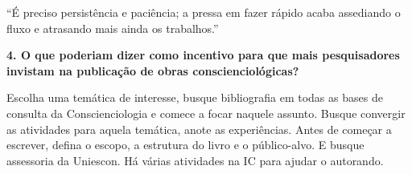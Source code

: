 \documentclass{gescons}
\begin{document}
\begin{multicols}{2}
\begin{pullquote}
    ``É preciso persistência e paciência; a pressa em fazer rápido acaba assediando o fluxo e atrasando mais ainda os trabalhos.''
\end{pullquote}

\textbf{4.       O que poderiam dizer como incentivo para que mais pesquisadores invistam na publicação de obras conscienciológicas?}

Escolha uma temática de interesse, busque bibliografia em todas as bases de consulta da Conscienciologia e comece a focar naquele assunto. Busque convergir as atividades para aquela temática, anote as experiências. Antes de começar a escrever, defina o escopo, a estrutura do livro e o público-alvo. E busque assessoria da Uniescon. Há várias atividades na IC para ajudar o autorando. 
    
    
    \end{multicols}
\end{document}
